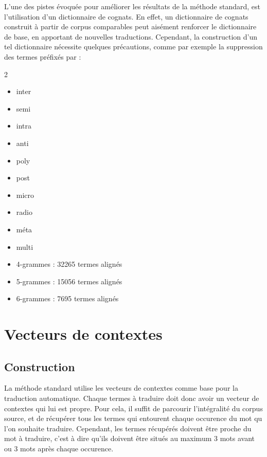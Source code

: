 	L'une des pistes évoquée pour améliorer les résultats de la méthode standard, est l'utilisation d'un dictionnaire de cognats. En effet, un dictionnaire de cognats construit à partir de corpus comparables peut aisément renforcer le dictionnaire de base, en apportant de nouvelles traductions. Cependant, la construction d'un tel dictionnaire nécessite quelques précautions, comme par exemple la suppression des termes préfixés par :
	\begin {multicols}{2}
	\begin{itemize}
		\item inter 
		\item semi 
		\item intra 
		\item anti 
		\item poly 
		\item post 
		\item micro 
		\item radio 
		\item méta 
		\item multi
	\end{itemize}
	\end {multicols}	

	\vspace{0.5cm}
	
	\begin{itemize}
		\item 4-grammes : 32265 termes alignés
		\item 5-grammes : 15056 termes alignés
		\item 6-grammes : 7695 termes alignés
	\end{itemize}
	

\section{Vecteurs de contextes}

	\subsection{Construction}
	
	La méthode standard utilise les vecteurs de contextes comme base pour la traduction automatique. Chaque termes à traduire doit donc avoir un vecteur de contextes qui lui est propre. Pour cela, il suffit de parcourir l'intégralité du corpus source, et de récupérer tous les termes qui entourent chaque occurence du mot qu l'on souhaite traduire. Cependant, les termes récupérés doivent être proche du mot à traduire, c'est à dire qu'ils doivent être situés au maximum 3 mots avant ou 3 mots après chaque occurence. \\
	
